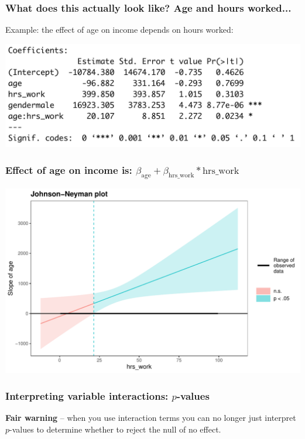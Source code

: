 \documentclass[aspectratio=169]{beamer}
\theoremstyle{principle}
\begin{document}
\begin{frame}
\frametitle{What does this actually look like?  Age and hours worked...}
Example: the effect of age on income depends on hours worked:
\begin{center}
\includegraphics[scale=0.4]{age_hours_interaction.png}
\end{center}

\end{frame}

\begin{frame}
\frametitle{Effect of age on income is: $\beta_{\mbox{age}} + \beta_{\mbox{hrs\_work}}*\mbox{hrs\_work}$}
\begin{center}
\includegraphics[scale=0.6]{age_hours.pdf}
\end{center}

\end{frame}

\begin{frame}
\frametitle{Interpreting variable interactions: $p$-values}

\Large
\textbf{Fair warning} -- when you use interaction terms you can no longer just interpret $p$-values to determine whether to reject the null of no effect.

\end{frame}
\end{document}
